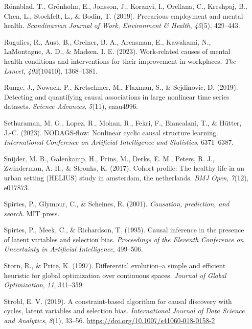 \documentclass[
]{article}
\newlength{\cslhangindent}
\newenvironment{CSLReferences}[2] %
 {\begin{list}{}{%
  \setlength{\itemindent}{0pt}
  \setlength{\leftmargin}{0pt}
  \setlength{\parsep}{0pt}
  \ifodd #1
   \setlength{\leftmargin}{\cslhangindent}
   \setlength{\itemindent}{-1\cslhangindent}
  \fi
  \setlength{\itemsep}{#2\baselineskip}}}
 {\end{list}}
\begin{document}
\begin{CSLReferences}{1}{0}
Rönnblad, T., Grönholm, E., Jonsson, J., Koranyi, I., Orellana, C.,
Kreshpaj, B., Chen, L., Stockfelt, L., \& Bodin, T. (2019). Precarious
employment and mental health. \emph{Scandinavian Journal of Work,
Environment \& Health}, \emph{45}(5), 429--443.

Rugulies, R., Aust, B., Greiner, B. A., Arensman, E., Kawakami, N.,
LaMontagne, A. D., \& Madsen, I. E. (2023). Work-related causes of
mental health conditions and interventions for their improvement in
workplaces. \emph{The Lancet}, \emph{402}(10410), 1368--1381.

Runge, J., Nowack, P., Kretschmer, M., Flaxman, S., \& Sejdinovic, D.
(2019). Detecting and quantifying causal associations in large nonlinear
time series datasets. \emph{Science Advances}, \emph{5}(11), eaau4996.

Sethuraman, M. G., Lopez, R., Mohan, R., Fekri, F., Biancalani, T., \&
Hütter, J.-C. (2023). NODAGS-flow: Nonlinear cyclic causal structure
learning. \emph{International Conference on Artificial Intelligence and
Statistics}, 6371--6387.

Snijder, M. B., Galenkamp, H., Prins, M., Derks, E. M., Peters, R. J.,
Zwinderman, A. H., \& Stronks, K. (2017). Cohort profile: The healthy
life in an urban setting (HELIUS) study in amsterdam, the netherlands.
\emph{BMJ Open}, \emph{7}(12), e017873.

Spirtes, P., Glymour, C., \& Scheines, R. (2001). \emph{Causation,
prediction, and search}. MIT press.

Spirtes, P., Meek, C., \& Richardson, T. (1995). Causal inference in the
presence of latent variables and selection bias. \emph{Proceedings of
the {Eleventh} Conference on {Uncertainty} in Artificial Intelligence},
499--506.

Storn, R., \& Price, K. (1997). Differential evolution--a simple and
efficient heuristic for global optimization over continuous spaces.
\emph{Journal of Global Optimization}, \emph{11}, 341--359.

Strobl, E. V. (2019). A constraint-based algorithm for causal discovery
with cycles, latent variables and selection bias. \emph{International
Journal of Data Science and Analytics}, \emph{8}(1), 33--56.
\url{https://doi.org/10.1007/s41060-018-0158-2}


\end{CSLReferences}
\end{document}
